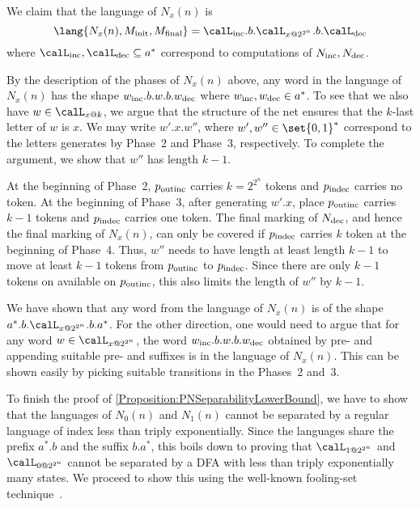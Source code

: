 \documentclass[../../diss.tex]{subfiles}
\begin{document}
We claim that the language of $N_x(n)$ is
\[
    \lang{N_x(n),\Minit,\Mfinal} = \calL_\textinc.b.\calL_{x @ 2^{2^n}}.b.\calL_\textdec
\]
where $\calL_\textinc, \calL_\textdec \subseteq a^*$ correspond to computations of $N_{\text{inc}},N_{\text{dec}}$.

By the description of the phases of $N_x(n)$ above, any word in the language of $N_x(n)$ has the shape $w_{\text{inc}}.b.w.b.w_{\text{dec}}$ where $w_{\text{inc}},w_{\text{dec}} \in a^*$.
To see that we also have $w \in \calL_{x @ k}$, we argue that the structure of the net ensures that the $k$-last letter of $w$ is $x$.
We may write $w'.x.w''$, where $w',w'' \in \set{0,1}^*$ correspond to the letters generates by Phase~2 and Phase~3, respectively.
To complete the argument, we show that $w''$ has length $k-1$.

At the beginning of Phase~2, $p_{\text{outinc}}$ carries $k = 2^{2^n}$ tokens and $p_{\text{indec}}$ carries no token.
At the beginning of Phase~3, \ie after generating $w'.x$, place $p_{\text{outinc}}$ carries $k-1$ tokens and $p_{\text{indec}}$ carries one token.
The final marking of $N_{\text{dec}}$, and hence the final marking of $N_x(n)$, can only be covered if $p_{\text{indec}}$ carries $k$ token at the beginning of Phase~4.
Thus, $w''$ needs to have length at least length $k-1$ to move at least $k-1$ tokens from $p_{\text{outinc}}$ to $p_{\text{indec}}$.
Since there are only $k-1$ tokens on available on $p_{\text{outinc}}$, this also limits the length of $w''$ by $k-1$.

We have shown that any word from the language of $N_x(n)$ is of the shape $a^*.b.\calL_{x @ 2^{2^n}}.b.a^*$.
For the other direction, one would need to argue that for any word $w \in \calL_{x @ 2^{2^n}}$, the word $w_{\text{inc}}.b.w.b.w_{\text{dec}}$ obtained by pre- and appending suitable pre- and suffixes is in the language of $N_x(n)$.
This can be shown easily by picking suitable transitions in the Phases~2 and~3.

To finish the proof of \cref{Proposition:PNSeparabilityLowerBound}, we have to show that the languages of $N_0(n)$ and $N_1(n)$ cannot be separated by a regular language of index less than triply exponentially.
Since the languages share the prefix $a^*.b$ and the suffix $b.a^*$, this boils down to proving that $\calL_{1 @ {2^{2^n}}}$ and $\calL_{0 @ {2^{2^n}}}$ cannot be separated by a DFA with less than triply exponentially many states.
We proceed to show this using the well-known fooling-set technique~\cite{Birget92,Birget93}.
\end{document}
